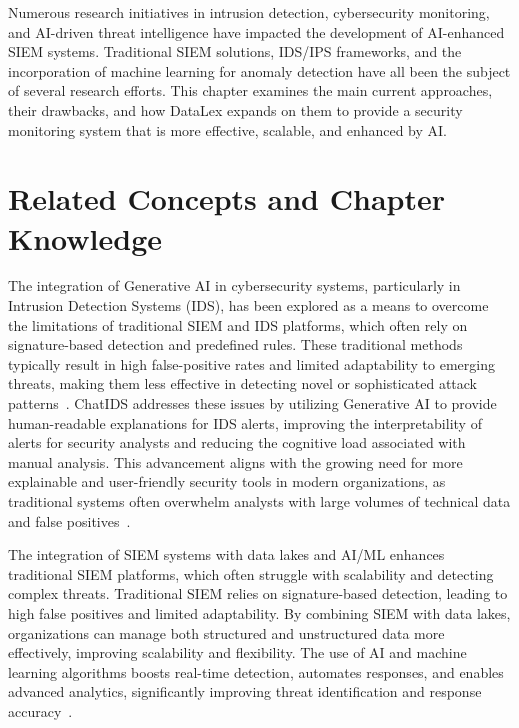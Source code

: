 Numerous research initiatives in intrusion detection, cybersecurity monitoring, and AI-driven threat intelligence have impacted the development of AI-enhanced SIEM systems. Traditional SIEM solutions, IDS/IPS frameworks, and the incorporation of machine learning for anomaly detection have all been the subject of several research efforts. This chapter examines the main current approaches, their drawbacks, and how DataLex expands on them to provide a security monitoring system that is more effective, scalable, and enhanced by AI.

\section{Related Concepts and Chapter Knowledge}
\label{sec_related_concepts}

The integration of Generative AI in cybersecurity systems, particularly in Intrusion Detection Systems (IDS), has been explored as a means to overcome the limitations of traditional SIEM and IDS platforms, which often rely on signature-based detection and predefined rules. These traditional methods typically result in high false-positive rates and limited adaptability to emerging threats, making them less effective in detecting novel or sophisticated attack patterns~\cite{juttner2023chatids}. ChatIDS addresses these issues by utilizing Generative AI to provide human-readable explanations for IDS alerts, improving the interpretability of alerts for security analysts and reducing the cognitive load associated with manual analysis. This advancement aligns with the growing need for more explainable and user-friendly security tools in modern organizations, as traditional systems often overwhelm analysts with large volumes of technical data and false positives~\cite{juttner2023chatids}.

The integration of SIEM systems with data lakes and AI/ML enhances traditional SIEM platforms, which often struggle with scalability and detecting complex threats. Traditional SIEM relies on signature-based detection, leading to high false positives and limited adaptability. By combining SIEM with data lakes, organizations can manage both structured and unstructured data more effectively, improving scalability and flexibility. The use of AI and machine learning algorithms boosts real-time detection, automates responses, and enables advanced analytics, significantly improving threat identification and response accuracy~\cite{marri2024siemdatalakes}.

